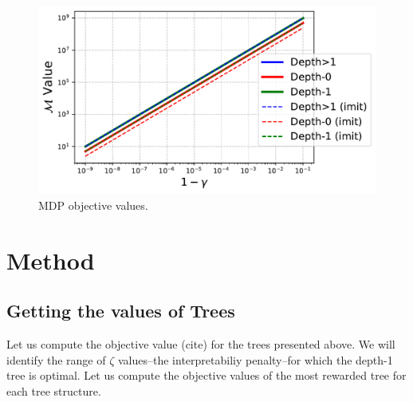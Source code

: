 \begin{figure}
    \centering
    \includegraphics[width=1\textwidth]{images/images_part1/policy_values_comparison.pdf}
    \caption{MDP objective values.}\label{fig:objectives}
\end{figure}

\section{Method}
\subsection{Getting the values of Trees}
Let us compute the objective value (cite) for the trees presented above. We will identify the range of $\zeta$ values--the interpretabiliy penalty--for which the depth-1 tree is optimal. 
Let us compute the objective values of the most rewarded tree for each tree structure.
